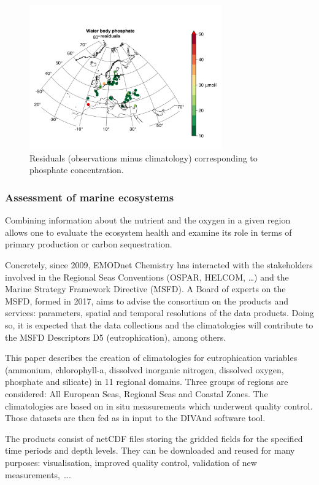 \documentclass[essd,manuscript]{copernicus}
\begin{document}
\begin{figure}[t]
\includegraphics[width=8.3cm]{residuals_Water_body_phosphate.png}
\caption{Residuals (observations minus climatology) corresponding to phosphate concentration.\label{fig:residuals}}
\end{figure}

\subsubsection{Assessment of marine ecosystems}

Combining information about the nutrient and the oxygen in a given region allows one to evaluate the ecosystem health and examine its role in terms of primary production or carbon sequestration.

Concretely, since 2009, EMODnet Chemistry has interacted with the stakeholders involved in the Regional Seas Conventions (OSPAR, HELCOM, \ldots) and the Marine Strategy Framework Directive (MSFD). A Board of experts on the MSFD, formed in 2017, aims to advise the consortium on the products and services: parameters, spatial and temporal resolutions of the data products. Doing so, it is expected that the data collections and the climatologies will contribute to the MSFD Descriptors D5 (eutrophication), among others.

\conclusions  
This paper describes the creation of climatologies for eutrophication variables (ammonium, chlorophyll-a, dissolved inorganic nitrogen, dissolved oxygen, phosphate and silicate) in 11 regional domains. Three groups of regions are considered: All European Seas, Regional Seas and Coastal Zones. The climatologies are based on in situ measurements which underwent quality control. Those datasets are then fed as in input to the DIVAnd software tool. 

The products consist of netCDF files storing the gridded fields for the specified time periods and depth levels. They can be downloaded and reused for many purposes: visualisation, improved quality control, validation of new measurements, \ldots. 
\end{document}
